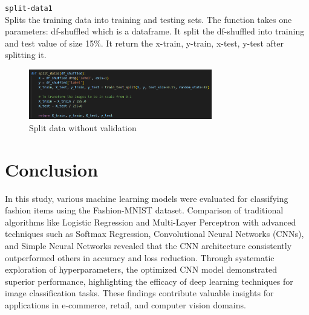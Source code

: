 \documentclass{article}
\newcommand{\code}[1]{\colorbox{light-gray}{\texttt{#1}}}
\begin{document}
\code{split-data1}\\
Splits the training data into training and testing sets.
The function takes one parameters: df-shuffled which is a dataframe.
It split the df-shuffled into training and test value of size 15\%.
It return the x-train, y-train, x-test, y-test after splitting it.
\begin{figure}[H]
    \caption{Split data without validation}
    \centering
    \includegraphics[width=8cm]{../imgFolder/splitData1.png}
\end{figure}

\section{Conclusion}
In this study, various machine learning models were evaluated for classifying fashion items using the Fashion-MNIST dataset.
Comparison of traditional algorithms like Logistic Regression and Multi-Layer Perceptron with advanced techniques such as Softmax Regression, Convolutional Neural Networks (CNNs), and Simple Neural Networks revealed that the CNN architecture consistently outperformed others in accuracy and loss reduction.
Through systematic exploration of hyperparameters, the optimized CNN model demonstrated superior performance, highlighting the efficacy of deep learning techniques for image classification tasks.
These findings contribute valuable insights for applications in e-commerce, retail, and computer vision domains.
\end{document}
